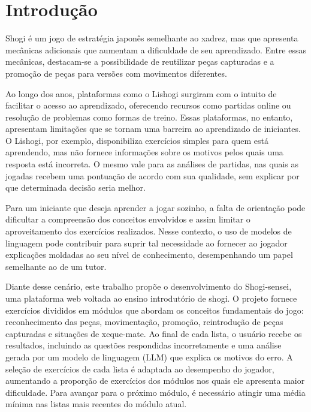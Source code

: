 
\chapter{Introdução}
\label{cap:introducao}

    Shogi é um jogo de estratégia japonês semelhante ao xadrez, mas que apresenta 
    mecânicas adicionais que aumentam a dificuldade de seu aprendizado. Entre essas mecânicas, 
    destacam-se a possibilidade de reutilizar peças capturadas e a promoção de peças para versões 
    com movimentos diferentes. 

    Ao longo dos anos, plataformas como o Lishogi surgiram com o intuito de facilitar o acesso ao aprendizado, 
    oferecendo recursos como partidas online ou resolução de problemas como formas de treino. Essas plataformas, 
    no entanto, apresentam limitações que se tornam uma barreira ao aprendizado de iniciantes. O Lishogi, 
    por exemplo, disponibiliza exercícios simples para quem está aprendendo, mas não fornece informações sobre os 
    motivos pelos quais uma resposta está incorreta. O mesmo vale para as análises de partidas, nas quais as jogadas 
    recebem uma pontuação de acordo com sua qualidade, sem explicar por que determinada decisão seria melhor.

    Para um iniciante que deseja aprender a jogar sozinho, a falta de orientação pode dificultar a compreensão dos conceitos envolvidos e assim limitar o aproveitamento dos exercícios realizados. Nesse contexto, o uso de modelos de linguagem pode contribuir para suprir tal necessidade ao fornecer ao jogador explicações moldadas ao seu nível de conhecimento, desempenhando um papel semelhante ao de um tutor. 

    Diante desse cenário, este trabalho propõe o desenvolvimento do Shogi-sensei, uma plataforma web voltada ao ensino
    introdutório de shogi. O projeto fornece exercícios divididos em módulos que abordam os conceitos fundamentais
    do jogo: reconhecimento das peças, movimentação, promoção, reintrodução de peças capturadas e situações de 
    xeque-mate.
    Ao final de cada lista, o usuário recebe os resultados, incluindo as questões respondidas incorretamente e uma análise
    gerada por um modelo de linguagem (LLM) que explica os motivos do erro. A seleção de exercícios de cada lista é adaptada
    ao desempenho do jogador, aumentando a proporção de exercícios dos módulos nos quais ele apresenta maior dificuldade.
    Para avançar para o próximo módulo, é necessário atingir uma média mínima nas listas mais recentes do módulo atual.
 
